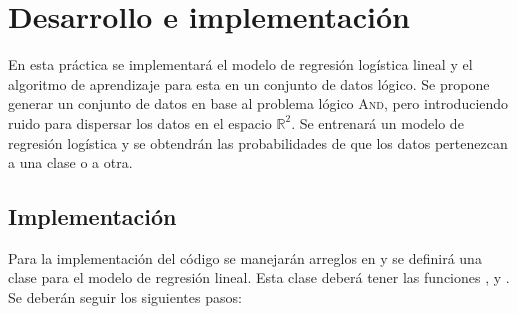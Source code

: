 \section{Desarrollo e implementación}

En esta práctica se implementará el modelo de regresión logística lineal y el algoritmo de aprendizaje para esta en un conjunto de datos lógico. Se propone generar un conjunto de datos en base al problema lógico \textsc{And}, pero introduciendo ruido para dispersar los datos en el espacio $\mathbb{R}^2$. Se entrenará un modelo de regresión logística y se obtendrán las probabilidades de que los datos pertenezcan a una clase o a otra.



\subsection{Implementación}

Para la implementación del código se manejarán arreglos en  y se definirá una clase para el modelo de regresión lineal. Esta clase deberá tener las funciones ,  y . Se deberán seguir los siguientes pasos:


